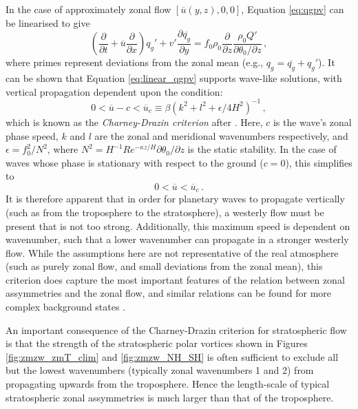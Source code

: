 In the case of approximately zonal flow $[\overline{u}(y,z),0,0]$, Equation
\ref{eq:qgpv} can be linearised to give
\begin{equation}
\left(\frac{\partial}{\partial t} + \overline{u}\frac{\partial}{\partial
    x}\right)q_g' + v'\frac{\partial\overline{q_g}}{\partial y} = f_0\rho_0 \frac{\partial}{\partial z}
\frac{\rho_0Q'}{\partial\theta_{0}/\partial z} \, ,
\label{eq:linear_qgpv} 
\end{equation}
where primes represent deviations from the zonal mean (e.g., $q_g =
\overline{q_g} + q_g'$). It can be shown that Equation \ref{eq:linear_qgpv}
supports wave-like solutions, with vertical propagation dependent upon the
condition:
\begin{equation}
0 < \overline{u}-c < \overline{u}_c \equiv \beta(k^2+l^2+\epsilon/4H^2)^{-1} \,,
\end{equation}
which is known as the \emph{Charney-Drazin criterion} after
\citet{Charney1961}. Here, $c$ is the wave's zonal phase speed, $k$ and $l$ are
the zonal and meridional wavenumbers respectively, and $\epsilon = f_0^2/N^2$,
where $N^2 = H^{-1}Re^{-\kappa z/H}\partial\theta_0/\partial z$ is the static
stability. In the case of waves whose phase is stationary with respect to the
ground ($c=0$), this simplifies to
\begin{equation}
0 < \overline{u} < \overline{u}_c\, . 
\label{eq:charney-drazin}
\end{equation}
It is therefore apparent that in order for planetary waves to propagate
vertically (such as from the troposphere to the stratosphere), a westerly flow
must be present that is not too strong. Additionally, this maximum speed is
dependent on wavenumber, such that a lower wavenumber can propagate in a
stronger westerly flow. While the assumptions here are not representative of the
real atmosphere (such as purely zonal flow, and small deviations from the zonal
mean), this criterion does capture the most important features of the relation
between zonal assymmetries and the zonal flow, and similar relations can be
found for more complex background states \citep{Andrews1987}.

An important consequence of the Charney-Drazin criterion for stratospheric flow
is that the strength of the stratospheric polar vortices shown in Figures
\ref{fig:zmzw_zmT_clim} and \ref{fig:zmzw_NH_SH} is often sufficient to exclude
all but the lowest wavenumbers (typically zonal wavenumbers 1 and 2) from
propagating upwards from the troposphere. Hence the length-scale of typical
stratospheric zonal assymmetries is much larger than that of the troposphere. 

